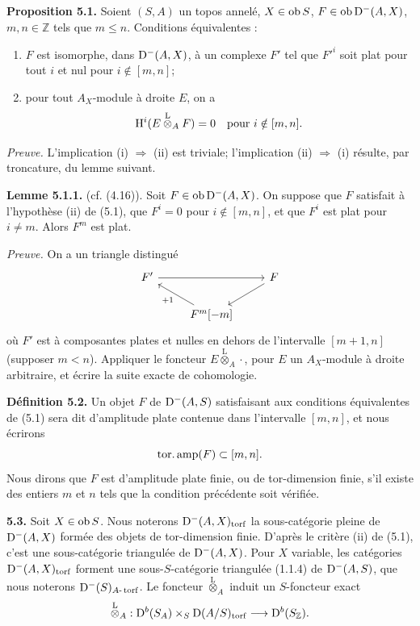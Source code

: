 \documentclass[11pt]{article}
\begin{document}
\textbf{Proposition 5.1.} Soient \((S,A)\) un topos annelé, \(X\in\operatorname{ob} S\), \(F\in\operatorname{ob}\mathrm D^-(A,X)\), \(m,n\in\mathbb Z\) tels que \(m\leq n\). Conditions équivalentes :
\begin{enumerate}[label=(\roman*)]
\item \(F\) est isomorphe, dans \(\mathrm D^-(A,X)\), à un complexe \(F'\) tel que \(F'^i\) soit plat pour tout \(i\) et nul pour \(i\notin[m,n]\);
\item pour tout \(A_X\)-module à droite \(E\), on a
\[
  \mathrm H^i(E\overset{\mathrm L}{\otimes}_A F)=0\quad\text{pour }i\notin[m,n].
\]
\end{enumerate}

\emph{Preuve.} L'implication (i) \(\Rightarrow\) (ii) est triviale; l'implication (ii) \(\Rightarrow\) (i) résulte, par troncature, du lemme suivant.

\textbf{Lemme 5.1.1.} (cf. (4.16)). Soit \(F\in\operatorname{ob}\mathrm D^-(A,X)\). On suppose que \(F\) satisfait à l'hypothèse (ii) de (5.1), que \(F^i=0\) pour \(i\notin[m,n]\), et que \(F^i\) est plat pour \(i\ne m\). Alors \(F^m\) est plat.

\emph{Preuve.} On a un triangle distingué
\[
\begin{tikzcd}
F' \arrow[rr] && F \arrow[dl]\\
& F^m[-m] \arrow[ul,"+1"] &
\end{tikzcd}
\]
où \(F'\) est à composantes plates et nulles en dehors de l'intervalle \([m+1,n]\) (supposer \(m<n\)). Appliquer le foncteur \(E\overset{\mathrm L}{\otimes}_A\cdot\), pour \(E\) un \(A_X\)-module à droite arbitraire, et écrire la suite exacte de cohomologie.

\textbf{Définition 5.2.} Un objet \(F\) de \(\mathrm D^-(A,S)\) satisfaisant aux conditions équivalentes de (5.1) sera dit d'amplitude plate contenue dans l'intervalle \([m,n]\), et nous écrirons
\[
  \operatorname{tor.amp}(F)\subset[m,n].
\]
Nous dirons que \(F\) est d'amplitude plate finie, ou de tor-dimension finie, s'il existe des entiers \(m\) et \(n\) tels que la condition précédente soit vérifiée.

\textbf{5.3.} Soit \(X\in\operatorname{ob} S\). Nous noterons \(\mathrm D^-(A,X)_{\operatorname{torf}}\) la sous-catégorie pleine de \(\mathrm D^-(A,X)\) formée des objets de tor-dimension finie. D'après le critère (ii) de (5.1), c'est une sous-catégorie triangulée de \(\mathrm D^-(A,X)\). Pour \(X\) variable, les catégories \(\mathrm D^-(A,X)_{\operatorname{torf}}\) forment une sous-\(S\)-catégorie triangulée (1.1.4) de \(\mathrm D^-(A,S)\), que nous noterons \(\mathrm D^-(S)_{A\text{-}\operatorname{torf}}\). Le foncteur \(\overset{\mathrm L}{\otimes}_A\) induit un \(S\)-foncteur exact
\[
  \overset{\mathrm L}{\otimes}_A:
  \mathrm D^b(S_A)\times_S \mathrm D(A/S)_{\operatorname{torf}}
  \longrightarrow \mathrm D^b(S_{\mathbb Z}).
\]
\end{document}
